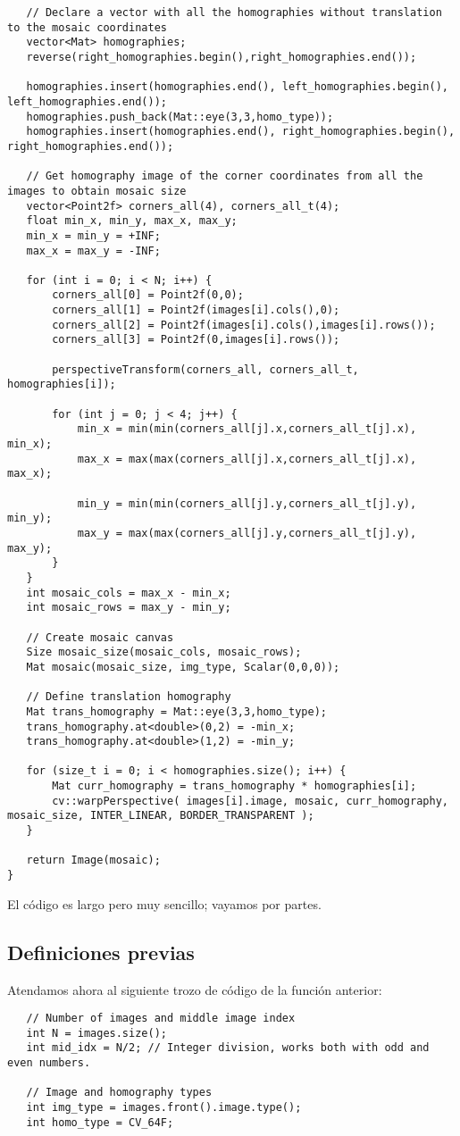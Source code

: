 \documentclass[a4paper, 11pt]{article}
\theoremstyle{definition}
\theoremstyle{theorem}
\begin{document}
\begin{lstlisting}
   // Declare a vector with all the homographies without translation to the mosaic coordinates
   vector<Mat> homographies;
   reverse(right_homographies.begin(),right_homographies.end());

   homographies.insert(homographies.end(), left_homographies.begin(), left_homographies.end());
   homographies.push_back(Mat::eye(3,3,homo_type));
   homographies.insert(homographies.end(), right_homographies.begin(), right_homographies.end());

   // Get homography image of the corner coordinates from all the images to obtain mosaic size
   vector<Point2f> corners_all(4), corners_all_t(4);
   float min_x, min_y, max_x, max_y;
   min_x = min_y = +INF;
   max_x = max_y = -INF;

   for (int i = 0; i < N; i++) {
       corners_all[0] = Point2f(0,0);
       corners_all[1] = Point2f(images[i].cols(),0);
       corners_all[2] = Point2f(images[i].cols(),images[i].rows());
       corners_all[3] = Point2f(0,images[i].rows());

       perspectiveTransform(corners_all, corners_all_t, homographies[i]);

       for (int j = 0; j < 4; j++) {
           min_x = min(min(corners_all[j].x,corners_all_t[j].x), min_x);
           max_x = max(max(corners_all[j].x,corners_all_t[j].x), max_x);

           min_y = min(min(corners_all[j].y,corners_all_t[j].y), min_y);
           max_y = max(max(corners_all[j].y,corners_all_t[j].y), max_y);
       }
   }
   int mosaic_cols = max_x - min_x;
   int mosaic_rows = max_y - min_y;

   // Create mosaic canvas
   Size mosaic_size(mosaic_cols, mosaic_rows);
   Mat mosaic(mosaic_size, img_type, Scalar(0,0,0));

   // Define translation homography
   Mat trans_homography = Mat::eye(3,3,homo_type);
   trans_homography.at<double>(0,2) = -min_x;
   trans_homography.at<double>(1,2) = -min_y;

   for (size_t i = 0; i < homographies.size(); i++) {
       Mat curr_homography = trans_homography * homographies[i];
       cv::warpPerspective( images[i].image, mosaic, curr_homography, mosaic_size, INTER_LINEAR, BORDER_TRANSPARENT );
   }

   return Image(mosaic);
}
   \end{lstlisting}
   El código es largo pero muy sencillo; vayamos por partes.

   \subsection{Definiciones previas}
   Atendamos ahora al siguiente trozo de código de la función anterior:
   \begin{lstlisting}
   // Number of images and middle image index
   int N = images.size();
   int mid_idx = N/2; // Integer division, works both with odd and even numbers.

   // Image and homography types
   int img_type = images.front().image.type();
   int homo_type = CV_64F;
   \end{lstlisting}
\end{document}

